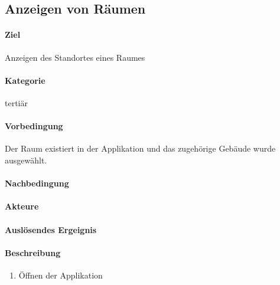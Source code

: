 \subsection{Anzeigen von Räumen}
\label{Anzeigen von Räumen}
\paragraph{Ziel}
Anzeigen des Standortes eines Raumes
\paragraph{Kategorie}
tertiär
\paragraph{Vorbedingung}
Der Raum existiert in der Applikation und das zugehörige Gebäude wurde ausgewählt.
\paragraph{Nachbedingung}

\paragraph{Akteure}

\paragraph{Auslösendes Ergeignis}

\paragraph{Beschreibung}
\begin{enumerate}
    \item Öffnen der Applikation
\end{enumerate}